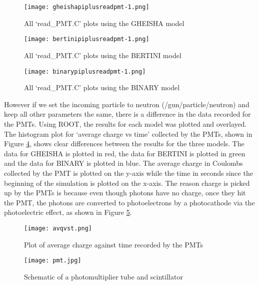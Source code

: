\documentclass[11pt,oneside,a4paper]{article}
\begin{document}
\begin{figure}[!htb]
	\centering
	\texttt{[image: gheishapiplusreadpmt-1.png]}
	\captionsetup{justification=centering}
	\caption{All `read\_PMT.C' plots using the GHEISHA model}
	\label{fig:pi+gheisha}
\end{figure}
\begin{figure}
	\centering
	\texttt{[image: bertinipiplusreadpmt-1.png]}
	\captionsetup{justification=centering}
	\caption{All `read\_PMT.C' plots using the BERTINI model}
	\label{fig:pi+bertini}
\end{figure}	
\begin{figure}
	\centering
	\texttt{[image: binarypiplusreadpmt-1.png]}
	\captionsetup{justification=centering}
	\caption{All `read\_PMT.C' plots using the BINARY model}
	\label{fig:pi+binary}	
\end{figure}

However if we set the incoming particle to neutron (/gun/particle/neutron) and keep all other parameters the same, there is a difference in the data recorded for the PMTs. Using ROOT, the results for each model was plotted and overlayed. The histogram plot for `average charge vs time' collected by the PMTs, shown in Figure \ref{fig:averagechargevstoverlay}, shows clear differences between the results for the three models. The data for GHEISHA is plotted in red, the data for BERTINI is plotted in green and the data for BINARY is plotted in blue. The average charge in Coulombs collected by the PMT is plotted on the y-axis while the time in seconds since the beginning of the simulation is plotted on the x-axis. The reason charge is picked up by the PMTs is because even though photons have no charge, once they hit the PMT, the photons are converted to photoelectrons by a photocathode via the photoelectric effect, as shown in Figure \ref{fig:pmt}.



\begin{figure}
	\centering
	\texttt{[image: avqvst.png]}
	\caption{Plot of average charge against time recorded by the PMTs}
	\label{fig:averagechargevstoverlay}
\end{figure}

\begin{figure}
	\centering
	\texttt{[image: pmt.jpg]}
	\caption{Schematic of a photomultiplier tube and scintillator}
	\label{fig:pmt}
\end{figure}
\end{document}

